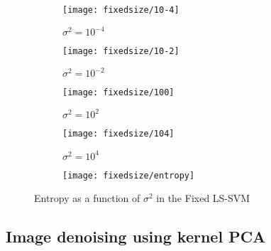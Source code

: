 \documentclass[conference,compsoc]{IEEEtran}
\begin{document}
\begin{figure*}[]
        \begin{subfigure}{0.33\linewidth}
            \texttt{[image: fixedsize/10-4]}
            \caption{$\sigma^2=10^{-4}$}
        \end{subfigure}
                \begin{subfigure}{0.33\linewidth}
            \texttt{[image: fixedsize/10-2]}
          \caption{$\sigma^2=10^{-2}$}
        \end{subfigure}
                \centering
        \begin{subfigure}{0.33\linewidth}
            \texttt{[image: fixedsize/100]}
    \caption{$\sigma^2=10^2$}
        \end{subfigure}
           \begin{subfigure}{0.33\linewidth}
            \texttt{[image: fixedsize/104]}
          \caption{$\sigma^2=10^4$}
        \end{subfigure}
        \centering
            \begin{subfigure}{0.33\linewidth}
            \texttt{[image: fixedsize/entropy]}  
        \end{subfigure}
                  
\caption{Entropy as a function of $\sigma^2$ in the Fixed LS-SVM}        
                   
        \label{fig:fixed}
    \end{figure*}





%

\subsection{Image denoising using kernel PCA}
\end{document}
